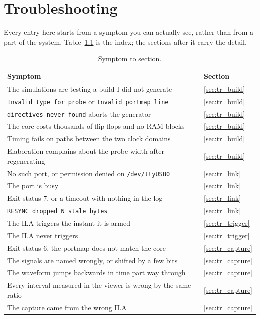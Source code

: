 \documentclass[../manual.tex]{subfiles}
\begin{document}
\chapter{Troubleshooting}
\label{ch:trouble}

Every entry here starts from a symptom you can actually see, rather than from a part of the system. Table~\ref{tab:tr_summary} is the index; the sections after it carry the detail.

\begin{table}[H]
    \centering
    \begin{tabularx}{\textwidth}{|X|l|}
        \hline
        \rowcolor{gray!40} \textbf{Symptom} & \textbf{Section} \\
        \hline
        The simulations are testing a build I did not generate & \ref{sec:tr_build} \\
        \hline
        \texttt{Invalid type for probe} or \texttt{Invalid portmap line} & \ref{sec:tr_build} \\
        \hline
        \texttt{directives never found} aborts the generator & \ref{sec:tr_build} \\
        \hline
        The core costs thousands of flip-flops and no RAM blocks & \ref{sec:tr_build} \\
        \hline
        Timing fails on paths between the two clock domains & \ref{sec:tr_build} \\
        \hline
        Elaboration complains about the probe width after regenerating & \ref{sec:tr_build} \\
        \hline
        No such port, or permission denied on \texttt{/dev/ttyUSB0} & \ref{sec:tr_link} \\
        \hline
        The port is busy & \ref{sec:tr_link} \\
        \hline
        Exit status 7, or a timeout with nothing in the log & \ref{sec:tr_link} \\
        \hline
        \texttt{RESYNC dropped N stale bytes} & \ref{sec:tr_link} \\
        \hline
        The ILA triggers the instant it is armed & \ref{sec:tr_trigger} \\
        \hline
        The ILA never triggers & \ref{sec:tr_trigger} \\
        \hline
        Exit status 6, the portmap does not match the core & \ref{sec:tr_capture} \\
        \hline
        The signals are named wrongly, or shifted by a few bits & \ref{sec:tr_capture} \\
        \hline
        The waveform jumps backwards in time part way through & \ref{sec:tr_capture} \\
        \hline
        Every interval measured in the viewer is wrong by the same ratio & \ref{sec:tr_capture} \\
        \hline
        The capture came from the wrong ILA & \ref{sec:tr_capture} \\
        \hline
    \end{tabularx}
    \caption{Symptom to section.}
    \label{tab:tr_summary}
\end{table}
\end{document}
